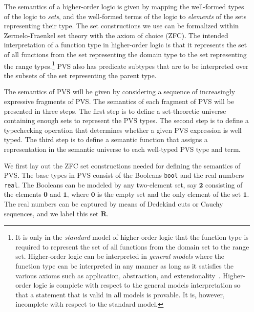 \documentclass [12pt,twoside]{cslreport}
\newcommand{\twob}{\mathbf{2}}
\newcommand{\oneb}{\mathbf{1}}
\newcommand{\zerob}{\mathbf{0}}
\newcommand{\reals}{\mathbf{R}}
\begin{document}
The semantics of a higher-order logic is given by mapping the well-formed
types of the logic to {\em sets\/}, and the well-formed terms of the logic to
{\em elements\/} of the sets representing their type.  The set
constructions we use can be formalized within Zermelo-Fraenkel set theory
with the axiom of choice (ZFC).   The intended interpretation
of a function type in higher-order logic is that it represents the set of
all functions from the set representing the domain type to the set
representing the range types.\footnote{It is only in the {\em standard\/}
model of higher-order logic that the function type is required to
represent the set of all 
functions from the domain set to the range set.  Higher-order logic can be
interpreted in {\em general models\/} where the function type can be
interpreted in any manner as long as it satisfies the various axioms
such as application, abstraction, and extensionality~\cite{Andrews:book}.
Higher-order logic 
is complete with respect to the general models interpretation so that
a statement that is valid in all models is provable.  It is, however,
incomplete with respect to the standard model.}  
PVS also has predicate subtypes that are to
be interpreted over the subsets of the set representing the parent type.

The semantics of PVS will be given by considering a sequence of
increasingly expressive fragments of PVS\@.   
The semantics of each fragment of PVS will be presented in three steps.
The first step is to define a set-theoretic universe containing
enough sets to represent the PVS types.  The second step is to define a
typechecking operation that determines whether a given PVS expression is
well typed.  The third step is to define a semantic function that assigns
a representation in the semantic universe to each well-typed PVS type and
term. 



\begin{comment}
I am not exactly sure where the axiom of choice is really needed.
Since PVS builds in a choice operator via parametric theories, it seems
that this will be needed.
\end{comment}


We first lay out the ZFC set constructions needed for defining the
semantics of PVS.  The base types in PVS consist of the Booleans
\texttt{bool} and the real numbers \texttt{real}\@.  The Booleans can be
modeled by any two-element set, say $\twob$ consisting of the elements
$\zerob$ and $\oneb$, where $\zerob$ is the empty set and the only element
of the set $\oneb$\@.  The real numbers can be captured by means of
Dedekind cuts or Cauchy sequences, and we label this set $\reals$\@.
\end{document}
